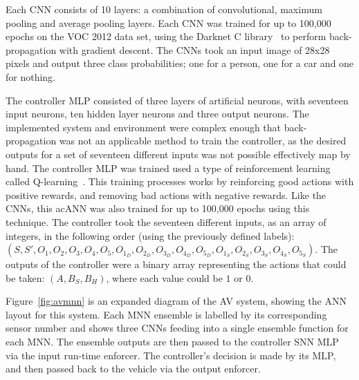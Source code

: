Each \ac{CNN} consists of 10 layers: a combination of convolutional, maximum pooling and average pooling layers.
Each \ac{CNN} was trained for up to 100,000 epochs on the \acf{VOC} 2012 data set, using the Darknet C library~\cite{darknet13} to perform back-propagation with gradient descent.
The \acp{CNN} took an input image of 28x28 pixels and output three class probabilities; one for a person, one for a car and one for nothing.

The controller \ac{MLP} consisted of three layers of artificial neurons, with seventeen input neurons, ten hidden layer neurons and three output neurons.
The implemented system and environment were complex enough that back-propagation was not an applicable method to train the controller, as the desired outputs for a set of seventeen different inputs was not possible effectively map by hand.
The controller \ac{MLP} was trained used a type of reinforcement learning called Q-learning~\cite{qlearning2010}.
This training processes works by reinforcing good actions with positive rewards, and removing bad actions with negative rewards.
Like the \acp{CNN}, this ac{ANN} was also trained for up to 100,000 epochs using this technique.
The controller took the seventeen different inputs, as an array of integers, in the following order (using the previously defined labels): $(S, S', O_1, O_2, O_3, O_4, O_5, O_{1_D}, O_{2_D}, O_{3_D}, O_{4_D}, O_{5_D}, O_{1_S}, O_{2_S}, O_{3_S}, O_{4_S}, O_{5_S})$.
The outputs of the controller were a binary array representing the actions that could be taken: $(A, B_S, B_H)$, where each value could be $1$ or $0$.

Figure~\ref{fig:avmnn} is an expanded diagram of the \ac{AV} system, showing the \ac{ANN} layout for this system.
Each \ac{MNN} ensemble is labelled by its corresponding sensor number and shows three \acp{CNN} feeding into a single ensemble function for each \ac{MNN}.
The ensemble outputs are then passed to the controller \ac{SNN} \ac{MLP} via the input run-time enforcer.
The controller's decision is made by its \ac{MLP}, and then passed back to the vehicle via the output enforcer.

